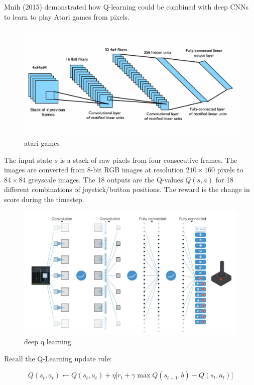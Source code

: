 \documentclass[11pt]{article}
\begin{document}
Mnih (2015) demonstrated how Q-learning could be combined with deep CNNs to
learn to play Atari games from pixels.

\begin{figure}[H]
    \centering
    \includegraphics[width=\textwidth]{../out/images/atari-games}
    \caption[atari games]{atari games}
    \label{fig:atari games}
\end{figure}

The input state $s$ is a stack of raw pixels from four consecutive frames.
The images are converted from 8-bit RGB images at resolution $210 \times 160$
pixels to $84 \times 84$ greyscale images.
The 18 outputs are the Q-values $Q(s,a)$ for 18 different combinations of
joystick/button positions.
The reward is the change in score during the timestep.

\begin{figure}[H]
    \centering
    \includegraphics[width=\textwidth]{../out/images/deep-q-learning}
    \caption[deep q learning]{deep q learning}
    \label{fig:deep q learning}
\end{figure}
Recall the Q-Learning update rule:

\[Q(s_t, a_t ) \leftarrow Q(s_t, a_t ) + \eta \bigg[ r_t + \gamma \max Q(s_{t+1}, b) - Q(s_t,a_t)\bigg]\]
\end{document}
